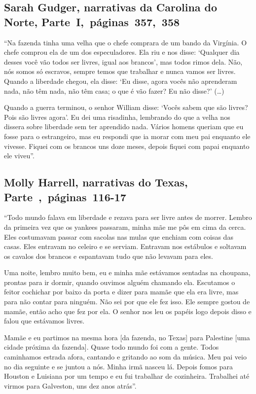 \subsection{Sarah Gudger, narrativas da Carolina do Norte, Parte~I,~páginas~357,~358}
\label{ref116}

``Na fazenda tinha uma velha que o chefe comprara de um bando da
Virgínia. O chefe comprou ela de um dos especuladores. Ela riu e nos
disse: `Qualquer dia desses você vão todos ser livres, igual aos
brancos', mas todos rimos dela. Não, nós somos só escravos, sempre temos
que trabalhar e nunca vamos ser livres. Quando a liberdade chegou, ela
disse: `Eu disse, agora vocês não aprenderam nada, não têm nada, não têm
casa; o que é vão fazer? Eu não disse?' (\ldots{})

Quando a guerra terminou, o senhor William disse: `Vocês sabem que são
livres? Pois são livres agora'. Eu dei uma risadinha, lembrando do que a
velha nos dissera sobre liberdade sem ter aprendido nada. Vários homens
queriam que eu fosse para o estrangeiro, mas eu respondi que ia morar
com meu pai enquanto ele vivesse. Fiquei com os brancos uns doze meses,
depois fiquei com papai enquanto ele viveu''.

\subsection{Molly Harrell, narrativas do Texas, Parte~,~páginas~116-17}
\label{ref122}

``Todo mundo falava em liberdade e rezava para ser livre antes de
morrer. Lembro da primeira vez que os yankees passaram, minha mãe me pôs
em cima da cerca. Eles costumavam passar com sacolas nas mulas que
enchiam com coisas das casas. Eles entravam no celeiro e se serviam.
Entravam nos estábulos e soltavam os cavalos dos brancos e espantavam
tudo que não levavam para eles.

Uma noite, lembro muito bem, eu e minha mãe estávamos sentadas na
choupana, prontas para ir dormir, quando ouvimos alguém chamando ela.
Escutamos o feitor cochichar por baixo da porta e dizer para mamãe que
ela era livre, mas para não contar para ninguém. Não sei por que ele fez
isso. Ele sempre gostou de mamãe, então acho que fez por ela. O senhor
nos leu os papéis logo depois disso e falou que estávamos livres.

Mamãe e eu partimos na mesma hora {[}da fazenda, no Texas{]} para
Palestine {[}uma cidade próxima da fazenda{]}. Quase todo mundo foi com
a gente. Todos caminhamos estrada afora, cantando e gritando ao som da
música. Meu pai veio no dia seguinte e se juntou a nós. Minha irmã
nasceu lá. Depois fomos para Houston e Luisiana por um tempo e eu fui
trabalhar de cozinheira. Trabalhei até virmos para Galveston, uns dez
anos atrás''.

